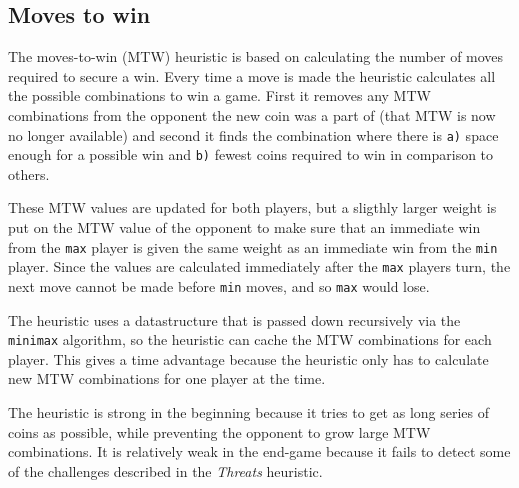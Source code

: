 \documentclass[a4paper, titlepage]{article}
\begin{document}
\subsection*{Moves to win}
The moves-to-win (MTW) heuristic is based on calculating the number of moves required to 
secure a win. Every time a move is made the heuristic calculates all the possible 
combinations to win a game. First it removes any MTW combinations from the opponent
the new coin was a part of (that MTW is now no longer available) and second it finds 
the combination where there is \texttt{a)} space enough for a possible win and 
\texttt{b)} fewest coins required to win in comparison to others.

These MTW values are updated for both players, but a sligthly larger weight is put on the 
MTW value of the opponent to make sure that an immediate win from the \texttt{max} player 
is given the same weight as an immediate win from the \texttt{min} player. Since the values 
are calculated immediately after the \texttt{max} players turn, the next move cannot be 
made before \texttt{min} moves, and so \texttt{max} would lose.

The heuristic uses a datastructure that is passed down recursively via the 
\texttt{minimax} algorithm, so the heuristic can cache the MTW combinations for each player.
This gives a time advantage because the heuristic only has to calculate new MTW 
combinations for one player at the time.

The heuristic is strong in the beginning because it tries to get as long series of coins
as possible, while preventing the opponent to grow large MTW combinations. It is 
relatively weak in the end-game because it fails to detect some of the challenges 
described in the \textit{Threats} heuristic.
\end{document}
